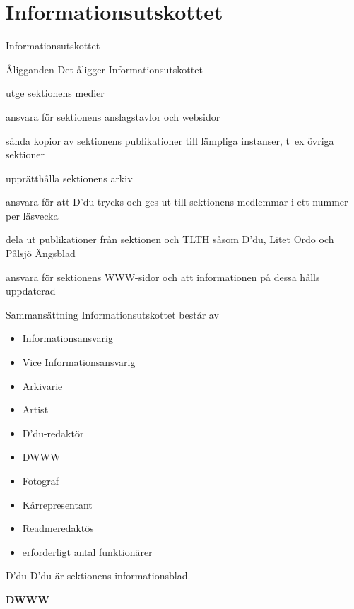 \documentclass[pdfbookmarks,a4paper,11pt]{article}
\newlength{\itemcollength}
\newenvironment{reglemlista}{%
  \begin{list}{}{%
      \setlength{\labelwidth}{\itemcollength}%
      \setlength{\leftmargin}{\labelwidth + \labelsep}%
      \renewcommand{\makelabel}[1]{%
        \raisebox{0pt}[1ex][0pt]{%
          \makebox[\labelwidth][l]{%
            \parbox[t]{\itemcollength}{%
              \raggedright\hspace{0pt}##1}}}\hfill}%
      }}{%
  \end{list}}
\begin{document}
\section{Informationsutskottet}Informationsutskottet

\begin{reglemlista}

  \item[Åligganden]
    Det åligger Informationsutskottet
    \begin{attlista}
      \item utge sektionens medier
      \item ansvara för sektionens anslagstavlor och websidor
      \item sända kopior av sektionens publikationer till lämpliga instanser, t~ex övriga sektioner
      \item upprätthålla sektionens arkiv
      \item ansvara för att D'du trycks och ges ut till sektionens medlemmar i ett nummer per läsvecka
      \item dela ut publikationer från sektionen och TLTH såsom D'du, Litet Ordo och Pålsjö Ängsblad
      \item ansvara för sektionens WWW-sidor och att informationen på dessa hålls uppdaterad
    \end{attlista}
    
     \item[Sammansättning]
    Informationsutskottet består av
    \begin{itemize}
      \item Informationsansvarig
      \item Vice Informationsansvarig
      \item Arkivarie
      \item Artist
      \item D'du-redaktör
      \item DWWW
      \item Fotograf
      \item Kårrepresentant
      \item Readmeredaktös
      \item erforderligt antal funktionärer
    \end{itemize}

  \item[D'du]
    D'du är sektionens informationsblad.
    
    \item[\textbf{DWWW}]
    

\end{reglemlista}
\end{document}

